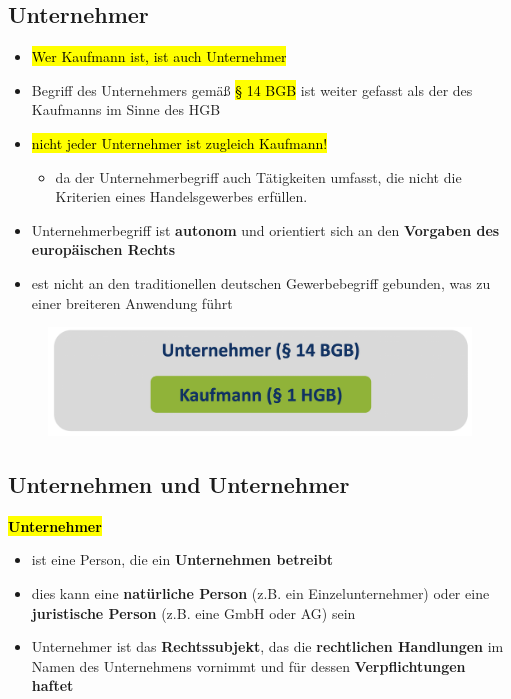 \documentclass[a4paper, 10pt]{article}
\begin{document}
\subsection{Unternehmer}
\begin{itemize}
    \item \hl{Wer Kaufmann ist, ist auch Unternehmer}
    \item Begriff des Unternehmers gemäß \hl{§ 14 BGB} ist weiter gefasst als der des Kaufmanns im Sinne des HGB
    \item \hl{nicht jeder Unternehmer ist zugleich Kaufmann!}
    \begin{itemize}
        \item da der Unternehmerbegriff auch Tätigkeiten umfasst, die nicht die Kriterien eines Handelsgewerbes erfüllen.
    \end{itemize}

    \item Unternehmerbegriff ist \textbf{autonom} und orientiert sich an den \textbf{Vorgaben des europäischen Rechts}
    \item est nicht an den traditionellen deutschen Gewerbebegriff gebunden, was zu einer breiteren Anwendung führt
\end{itemize}

\begin{figure}[h]
    \centering
    \includegraphics[width=0.5\linewidth]{Bildschirmfoto 2024-10-30 um 13.10.17.png}
    
    \label{fig:enter-label}
\end{figure}
\subsection{Unternehmen und Unternehmer}
\textbf{\hl{Unternehmer}}
\begin{itemize}
    \item ist eine Person, die ein \textbf{Unternehmen betreibt}
    \item dies kann eine \textbf{natürliche Person} (z.B. ein Einzelunternehmer) oder eine \textbf{juristische Person} (z.B. eine GmbH oder AG) sein
    \item Unternehmer ist das \textbf{Rechtssubjekt}, das die \textbf{rechtlichen Handlungen} im Namen des Unternehmens vornimmt und für dessen \textbf{Verpflichtungen haftet}
\end{itemize}
\end{document}
